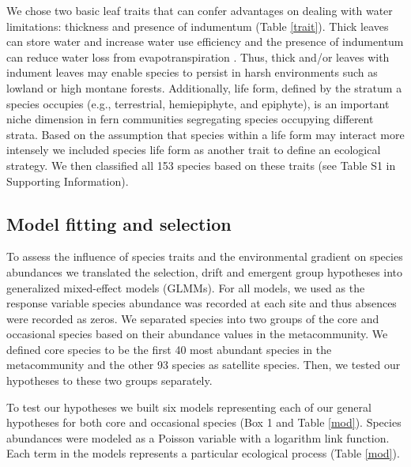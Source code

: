 \documentclass[12pt]{article}
\begin{document}
We chose two basic leaf traits that can confer advantages on dealing
with water limitations: thickness and presence of indumentum (Table
\ref{trait}). Thick leaves can store water and increase water use
efficiency and the presence of indumentum can reduce water loss from
evapotranspiration \citep{Watkins2012}. Thus, thick and/or leaves with indument
leaves may enable species to persist in harsh environments such as
lowland or high montane forests.  Additionally, life form, defined by
the stratum a species occupies (e.g., terrestrial, hemiepiphyte, and
epiphyte), is an important niche dimension in fern communities
segregating species occupying different strata.  Based on the
assumption that species within a life form may interact more intensely
we included species life form as another trait to define an ecological
strategy. We then classified all 153 species based on these traits
(see Table S1 in Supporting Information).

\subsection*{Model fitting and selection}

To assess the influence of species traits and the environmental
gradient on species abundances we translated the selection, drift and
emergent group hypotheses into generalized mixed-effect models
(GLMMs).  For all models, we used as the response variable species
abundance was recorded at each site and thus absences were recorded as
zeros. We separated species into two groups of the core and occasional
species based on their abundance values in the metacommunity. We
defined core species to be the first 40 most abundant species in the
metacommunity and the other 93 species as satellite species. Then, we
tested our hypotheses to these two groups separately.

To test our hypotheses we built six models representing each of our
general hypotheses for both core and occasional species (Box 1 and
Table \ref{mod}). Species abundances were modeled as a Poisson
variable with a logarithm link function.  Each term in the models
represents a particular %
ecological process (Table \ref{mod}).
\end{document}
